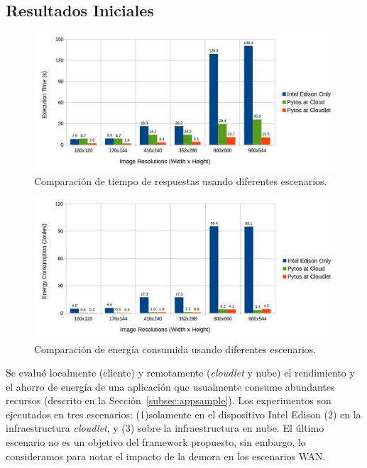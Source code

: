 \subsection{Resultados Iniciales}



\begin{figure}
\centering
 \includegraphics[scale=0.35]{Figures/timeRepsonseBenchmark}
 \caption{Comparación de tiempo de respuestas usando diferentes escenarios.}
 \label{fig:timesResponseBenchmark}
\end{figure}

\begin{figure}
\centering
 \includegraphics[scale=0.35]{Figures/energyBenchmark}
 \caption{Comparación de energía consumida usando diferentes escenarios.}
 \label{fig:energyBenchmark}
\end{figure}
Se evaluó localmente (cliente) y remotamente (\textit{cloudlet} y nube) el rendimiento y el ahorro de energía de una aplicación que usualmente consume abundantes recursos (descrito en 
la Sección~\ref{subsec:appsample}). Los experimentos son ejecutados en tres escenarios: (1)solamente en el dispositivo Intel Edison (2)
en la infraestructura \textit{cloudlet}, y (3) sobre la infraestructura en nube. El último escenario no es un objetivo del framework propuesto,
sin embargo, lo consideramos para notar el impacto de la demora en los escenarios WAN. 

